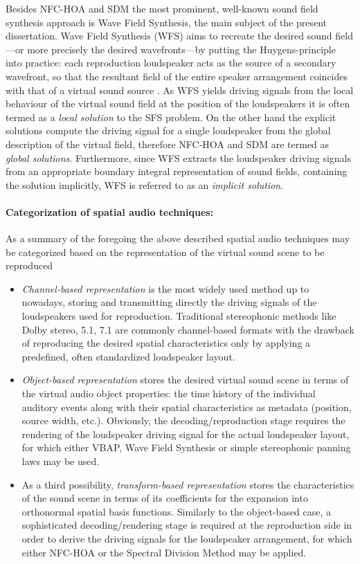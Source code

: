 Besides NFC-HOA and SDM the most prominent, well-known sound field synthesis approach is Wave Field Synthesis, the main subject of the present dissertation.
Wave Field Synthesis (WFS) aims to recreate the desired sound field---or more precisely the desired wavefronts---by putting the Huygens-principle into practice: 
each reproduction loudspeaker acts as the source of a secondary wavefront, so that the resultant field of the entire speaker arrangement coincides with that of a virtual sound source \cite{Berkhout1993:Acoustic_control_by_WFS, Verheijen1997:phd, Ahrens2012}.
As WFS yields driving signals from the local behaviour of the virtual sound field at the position of the loudspeakers it is often termed as a \emph{local solution} to the SFS problem.
On the other hand the explicit solutions compute the driving signal for a single loudspeaker from the global description of the virtual field, therefore NFC-HOA and SDM are termed as \emph{global solutions}.
Furthermore, since WFS extracts the loudspeaker driving signals from an appropriate boundary integral representation of sound fields, containing the solution implicitly, WFS is referred to as an \emph{implicit solution}.

\paragraph{Categorization of spatial audio techniques:}
As a summary of the foregoing the above described spatial audio techniques may be categorized based on the representation of the virtual sound scene to be reproduced \cite{Spors2013:Survey}
\begin{itemize}
\item \emph{Channel-based representation} is the most widely used method up to nowadays, storing and transmitting directly the driving signals of the loudspeakers used for reproduction.
Traditional stereophonic methods like Dolby stereo, 5.1, 7.1 are commonly channel-based formats with the drawback of reproducing the desired spatial characteristics only by applying a predefined, often standardized loudspeaker layout.
%
\item \emph{Object-based representation} stores the desired virtual sound scene in terms of the virtual audio object properties: the time history of the individual auditory events along with their spatial characteristics as metadata (position, source width, etc.).
Obviously, the decoding/reproduction stage requires the rendering of the loudspeaker driving signal for the actual loudspeaker layout, for which either VBAP, Wave Field Synthesis or simple stereophonic panning laws may be used.
%
\item As a third possibility, \emph{transform-based representation} stores the characteristics of the sound scene in terms of its coefficients for the expansion into  orthonormal spatial basis functions.
Similarly to the object-based case, a sophisticated decoding/rendering stage is required at the reproduction side in order to derive the driving signals for the loudspeaker arrangement, for which either NFC-HOA or the Spectral Division Method may be applied.
\end{itemize}

